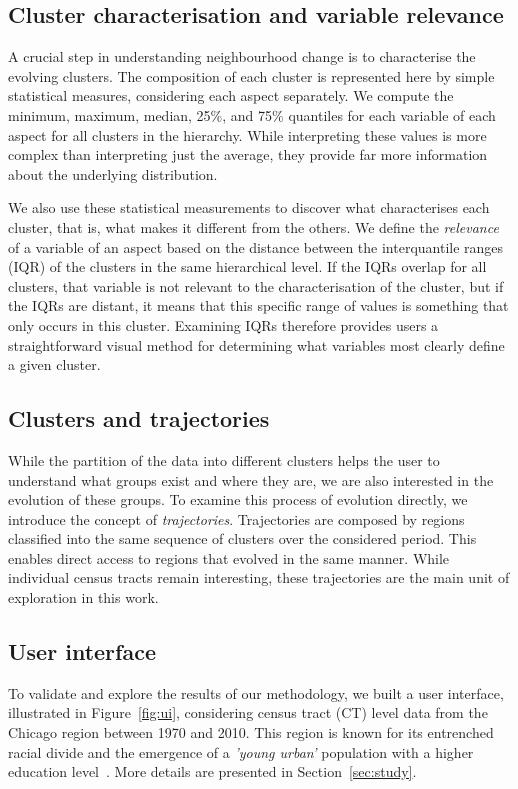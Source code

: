 \subsection{Cluster characterisation and variable relevance}
\label{sec:relevance}
A crucial step in understanding neighbourhood change is to characterise the
evolving clusters.  The composition of each cluster is represented here by
simple statistical measures, considering each aspect separately. We compute the
minimum, maximum, median, 25\%, and 75\% quantiles for each variable of each
aspect for all clusters in the hierarchy. While interpreting these values is
more complex than interpreting just the average, they provide far more
information about the underlying distribution.


We also use these statistical measurements to discover what characterises each
cluster, that is, what makes it different from the others.  We define the
\emph{relevance} of a variable of an aspect based on the distance between the
interquantile ranges (IQR) of the clusters in the same hierarchical level. If
the IQRs overlap for all clusters, that variable is not relevant to the
characterisation of the cluster, but if the IQRs are distant, it means that this
specific range of values is something that only occurs in this cluster.
Examining IQRs therefore provides users a straightforward visual method for
determining what variables most clearly define a given cluster.


\subsection{Clusters and trajectories}
While the partition of the data into different clusters helps the user to
understand what groups exist and where they are, we are also interested in the
evolution of these groups. To examine this process of evolution directly, we
introduce the concept of \emph{trajectories}. Trajectories are composed by
regions classified into the same sequence of clusters over the considered
period. This enables direct access to regions that evolved in the same manner.
While individual census tracts remain interesting, these trajectories are the
main unit of exploration in this work.


\subsection{User interface}
\label{sec:ui}
To validate and explore the results of our methodology, we built a user
interface, illustrated in Figure~\ref{fig:ui}, considering census tract (CT)
level data from the Chicago region between 1970 and 2010. This region is known
for its entrenched racial divide and the emergence of a \emph{'young urban'}
population with a higher education level~\citep{Delmelle2016,Delmelle2017}. More
details are presented in Section~\ref{sec:study}.


